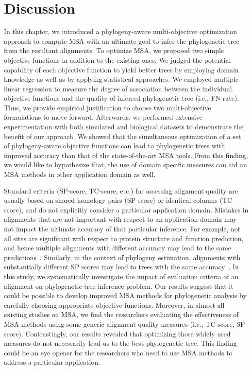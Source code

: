 \section{Discussion}
\label{sec:discussion}
In this chapter, we introduced a phylogeny-aware multi-objective optimization approach to compute MSA with an ultimate goal to infer the phylogenetic tree from the resultant alignments. To optimize MSA, we proposed two simple objective functions in addition to the existing ones. We judged the potential capability of each objective function to yield better trees by employing domain knowledge as well as by applying statistical approaches. We employed multiple linear regression to measure the degree of association between the individual objective functions and the quality of inferred phylogenetic tree (i.e., FN rate). Thus, we provide empirical justification to choose two multi-objective formulations to move forward. Afterwards, we performed extensive experimentation with both simulated and biological datasets to demonstrate the benefit of our approach. We showed that the simultaneous optimization of a set of phylogeny-aware objective functions can lead to phylogenetic trees with improved accuracy than that of the state-of-the-art MSA tools. From this finding, we would like to hypothesize that, the use of domain specific measures can aid an MSA methods in other application domain as well.

Standard criteria (SP-score, TC-score, etc.) for assessing alignment quality are usually based on shared homology pairs (SP score) or identical columns (TC score), and do not explicitly consider a particular application domain. Mistakes in alignments that are not important with respect to an application domain may not impact the ultimate accuracy of that particular inference. For example, not all sites are significant with respect to protein structure and function prediction, and hence multiple alignments with different accuracy may lead to the same predictions~\citep{warnow2013large}. Similarly, in the context of phylogeny estimation, alignments with substantially different SP scores may lead to trees with the same accuracy~\citep{liu2009rapid}. In this study, we systematically investigate the impact of evaluation criteria of an alignment on phylogenetic tree inference problem. Our results suggest that it could be possible to develop improved MSA methods for phylogenetic analysis by carefully choosing appropriate objective functions. Moreover, in almost all existing studies on MSA, we find the researchers evaluating the effectiveness of MSA methods using some generic alignment quality measures (i.e., TC score, SP score). Contrastingly, our results revealed that optimizing those widely used measures do not necessarily lead us to the best phylogenetic tree. This finding could be an eye opener for the researchers who need to use MSA methods to address a particular application. 

